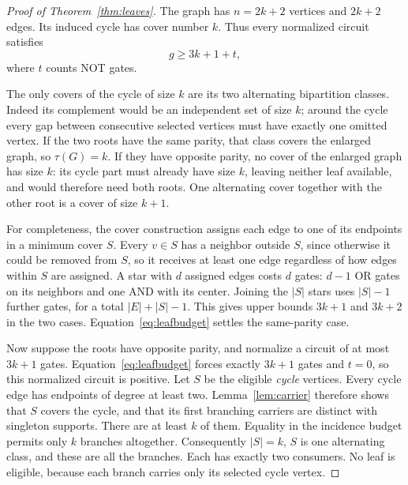 \begin{proof}[Proof of Theorem~\ref{thm:leaves}]
The graph has $n=2k+2$ vertices and $2k+2$ edges. Its induced cycle has
cover number $k$. Thus every normalized circuit satisfies
\begin{equation}\label{eq:leafbudget}
                   g\ge3k+1+t,
\end{equation}
where $t$ counts NOT gates.

The only covers of the cycle of size $k$ are its two alternating
bipartition classes. Indeed its complement would be an independent set
of size $k$; around the cycle every gap between consecutive selected
vertices must have exactly one omitted vertex. If the two roots have
the same parity, that class covers the enlarged graph, so $\tau(G)=k$.
If they have opposite parity, no cover of the enlarged graph has size
$k$: its cycle part must already have size $k$, leaving neither leaf
available, and would therefore need both roots. One alternating cover
together with the other root is a cover of size $k+1$.

For completeness, the cover construction assigns each edge to one of
its endpoints in a minimum cover $S$. Every $v\in S$ has a neighbor
outside $S$, since otherwise it could be removed from $S$, so it receives
at least one edge regardless of how edges within $S$ are assigned.
A star with $d$ assigned edges costs $d$ gates: $d-1$ OR gates on its
neighbors and one AND with its center. Joining the $|S|$ stars uses
$|S|-1$ further gates, for a total $|E|+|S|-1$.
This gives upper bounds $3k+1$ and $3k+2$ in the two cases.
Equation~\eqref{eq:leafbudget} settles the same-parity case.

Now suppose the roots have opposite parity, and normalize a circuit of
at most $3k+1$ gates. Equation~\eqref{eq:leafbudget} forces exactly
$3k+1$ gates and $t=0$, so this normalized circuit is positive.
Let $S$ be the eligible \emph{cycle} vertices. Every cycle edge has
endpoints of degree at least two. Lemma~\ref{lem:carrier} therefore
shows that $S$ covers the cycle, and that its first branching carriers
are distinct with singleton supports. There are at least $k$ of them.
Equality in the incidence budget permits only $k$ branches altogether.
Consequently $|S|=k$, $S$ is one alternating class, and these are all the
branches. Each has exactly two consumers. No leaf is eligible, because
each branch carries only its selected cycle vertex.


\end{proof}
